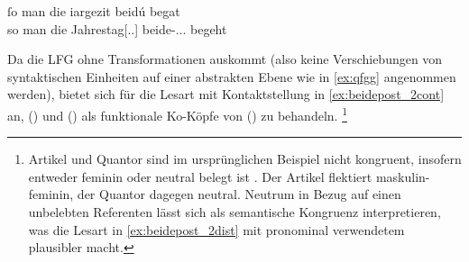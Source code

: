 \begin{exe}

	\ex \label{ex:beidepost_2}
		\gll ſo man die iargezit beidú begat \\
			so man die Jahrestag[\Acc.\Pl.\NeutI] beide-\Acc.\Pl.\NeutI.\St{}
			begeht \\
		\begin{taggedline}{\parencites(Straßburg und Colmar, 1299)[\pno~3331, 468.21--22]{cao4}}
		\trans {}
		\end{taggedline}

\end{exe}

Da die LFG ohne Transformationen auskommt (also keine Verschiebungen von
syntaktischen Einheiten auf einer abstrakten Ebene wie in \cref{ex:qfgg}
angenommen werden), bietet sich für die Lesart mit Kontaktstellung in
\cref{ex:beidepost_2cont} an,
 () und  () als funktionale Ko-Köpfe
von   () zu behandeln.%
%
	\footnote{Artikel und Quantor sind im ursprünglichen Beispiel nicht
		kongruent, insofern  entweder feminin oder neutral belegt
		ist \autocite[\pno~]{lexer:mhdhwb}. Der Artikel 
		flektiert maskulin-feminin, der Quantor  dagegen neutral.
		Neutrum in Bezug auf einen unbelebten Referenten lässt sich als
		semantische Kongruenz interpretieren, was die Lesart in
		\cref{ex:beidepost_2dist} mit pronominal verwendetem 
		plausibler macht.}

